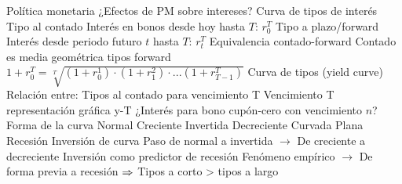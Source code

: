 \documentclass{nuevotema}
\begin{document}
\begin{esquemal}
				\4 Política monetaria
				\4[] ¿Efectos de PM sobre intereses?
		\2 Curva de tipos de interés
			\3 Tipo al contado
				\4 Interés en bonos desde hoy hasta $T$: $r_0^T$
			\3 Tipo a plazo/forward
				\4 Interés desde periodo futuro $t$ hasta $T$: $r_t^T$
			\3 Equivalencia contado-forward
				\4 Contado es media geométrica tipos forward
				\4[] $1+r_0^T = \sqrt[T]{(1+r_0^1) \cdot (1+r_1^2) \cdot ... (1 + r^T_{T-1}) }$
			\3 Curva de tipos (yield curve)
				\4 Relación entre:
				\4[] Tipos al contado para vencimiento T
				\4[] Vencimiento T
				\4 representación gráfica y-T
				\4 ¿Interés para bono cupón-cero con vencimiento $n$?
			\3 Forma de la curva
				\4 Normal
				\4[] Creciente
				\4 Invertida
				\4[] Decreciente
				\4 Curvada
				\4 Plana
			\3 Recesión
				\4 Inversión de curva
				\4[] Paso de normal a invertida
				\4[] $\to$ De creciente a decreciente
				\4 Inversión como predictor de recesión
				\4[] Fenómeno empírico
				\4[] $\to$ De forma previa a recesión
				\4[] $\Rightarrow$ Tipos a corto > tipos a largo


\end{esquemal}
\end{document}
